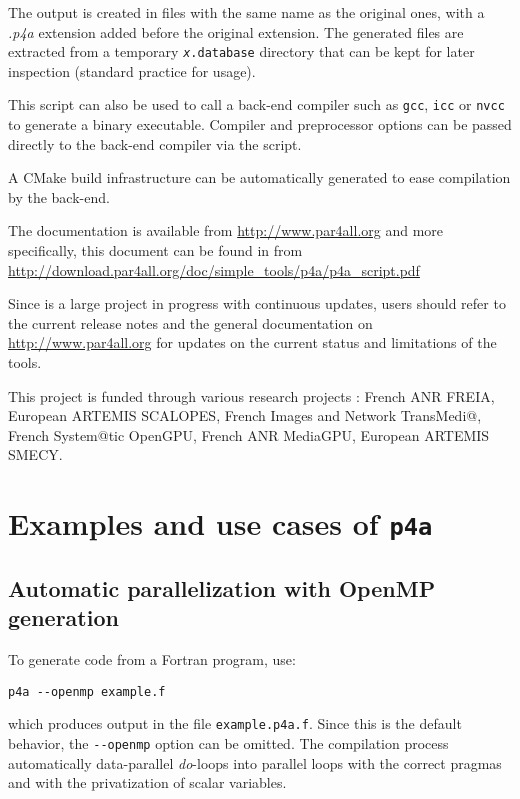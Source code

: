\documentclass[a4paper]{article}
\begin{document}
The output is created in files with the same name as the original ones, with a
\emph{.p4a} extension added before the original extension. The generated files are
extracted from a temporary \texttt{\emph{x}.database} directory that can be kept
for later inspection (standard practice for \Apips usage).

This script can also be used to call a back-end compiler such as
\texttt{gcc}, \texttt{icc} or \texttt{nvcc} to generate a binary
executable. Compiler and preprocessor options can be passed directly
to the back-end compiler via the script.

A CMake build infrastructure can be automatically generated to ease
compilation by the back-end.

The \Apfa documentation is available from \url{http://www.par4all.org} and
more specifically, this document can be found in \Apdf from
\url{http://download.par4all.org/doc/simple_tools/p4a/p4a_script.pdf}

Since \Apfa is a large project in progress with continuous updates,
users should refer to the current release notes and the general
documentation on
\url{http://www.par4all.org} for updates on
the current status and limitations of the tools.

This project is funded through various research projects : French ANR
FREIA, European ARTEMIS SCALOPES, French Images and Network TransMedi@,
French System@tic OpenGPU, French ANR MediaGPU, European ARTEMIS SMECY.


\section{Examples and use cases of \protect\texttt{p4a}}
\label{sec:examples}

\subsection{Automatic parallelization with OpenMP generation}
\label{sec:autom-parall-with}

To generate \Aopenmp code from a Fortran program, use:
\begin{verbatim}
p4a --openmp example.f
\end{verbatim}
which produces output in the file \texttt{example.p4a.f}. Since this is
the default
behavior, the \verb/--openmp/ option can be omitted. The compilation
process automatically data-parallel \emph{do}-loops into
\Aopenmp parallel loops with the correct pragmas and with the privatization of
scalar variables.
\end{document}
